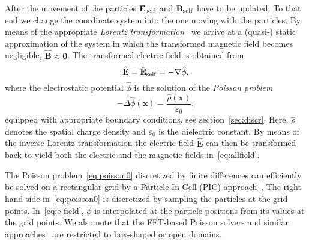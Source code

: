 After the movement of the particles 
$\mathbf{E_{\RM{self}}}$ and $\mathbf{B_{\RM{self}}}$ have to be updated.  
To that end we change the coordinate system into the one moving with the
particles.  By means of the appropriate \emph{Lorentz
  transformation}~\cite{lali:84} we arrive at a (quasi-) static
approximation of the system in which the transformed magnetic field
becomes negligible, $\hat{\mathbf{B}}\! \approx\! \mathbf{0}$.  The
transformed electric field is obtained from
\begin{equation}\label{eq:e-field}
  \hat{\mathbf{E}}=\hat{\mathbf{E}}_{\RM{self}}=-\nabla\hat{\phi},
\end{equation}
where the electrostatic potential $\hat{\phi}$ is the solution of the
\emph{Poisson problem}
\begin{equation}\label{eq:poisson0}
  - \Delta \hat{\phi}(\mathbf{x}) =
  \frac{\hat{\rho}(\mathbf{x})}{\varepsilon_0},
\end{equation}
equipped with appropriate boundary conditions, see
section~\ref{sec:discr}.  Here, $\hat{\rho}$ denotes the spatial charge
density and $\varepsilon_0$ is the dielectric constant.
By means of the inverse Lorentz transformation the electric field
$\hat{\mathbf{E}}$ can then be transformed back to yield both the
electric and the magnetic fields in~\eqref{eq:allfield}.

The Poisson problem~\eqref{eq:poisson0} discretized by finite
differences can efficiently be solved on a rectangular grid by a
Particle-In-Cell (PIC) approach~\cite{qiry:01}.  The right hand side
in~\eqref{eq:poisson0} is discretized by sampling the particles at the
grid points.  In~\eqref{eq:e-field}, $\hat{\phi}$ is interpolated at the
particle positions from its values at the grid points. We also note that
the FFT-based Poisson solvers and similar
approaches~\cite{qiry:01,qigl:04} are restricted to box-shaped or open domains.

